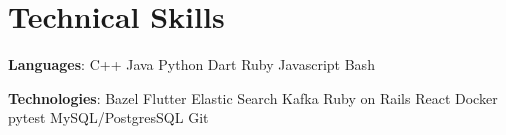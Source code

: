 \documentclass[]{Klement_Resume}
\begin{document}
\begin{minipage}[t]{1\textwidth}
  \section{Technical Skills} 
  \vspace{\topsep} %
  \begin{tightemize}
    \item {\bf Languages}: C++ \textbullet{} Java \textbullet{} Python \textbullet{}  Dart \textbullet{} Ruby \textbullet{} Javascript \textbullet{} Bash
    \item {\bf Technologies}: Bazel \textbullet{} Flutter \textbullet{} Elastic Search \textbullet{} Kafka \textbullet{} Ruby on Rails \textbullet{} React \textbullet{} Docker \textbullet{} pytest \textbullet{} MySQL/PostgresSQL \textbullet{} Git
    \end{tightemize}

  \end{minipage} 
  
\end{document}
